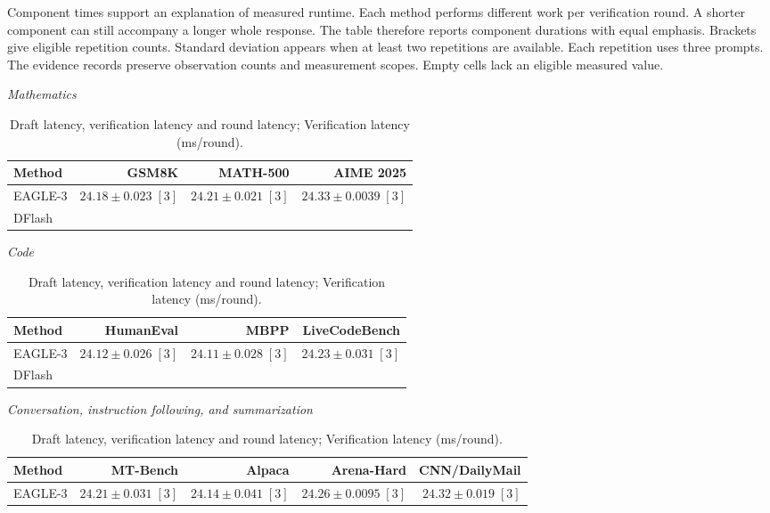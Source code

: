 \documentclass[conference,onecolumn]{IEEEtran}
\begin{document}
\begin{table}[!htp]
\begin{minipage}{\linewidth}
Component times support an explanation of measured runtime. Each method performs different work per verification round. A shorter component can still accompany a longer whole response. The table therefore reports component durations with equal emphasis.
Brackets give eligible repetition counts. Standard deviation appears when at least two repetitions are available. Each repetition uses three prompts. The evidence records preserve observation counts and measurement scopes. Empty cells lack an eligible measured value.
\end{minipage}
\end{table}

\begin{table}[!htp]
\centering\small
\setlength{\tabcolsep}{3pt}
\caption{Draft latency, verification latency and round latency; Verification latency (ms/round).}
\label{tab:appendix-metric-component-time-verification-latency-none}
\textit{Mathematics}\par\smallskip
\begin{tabular}{@{}>{\raggedright\arraybackslash}p{3.7cm}rrr@{}}
\toprule
Method & GSM8K & MATH-500 & AIME 2025 \\
\midrule
EAGLE-3 & \(24.18 \pm 0.023\;[3]\) & \(24.21 \pm 0.021\;[3]\) & \(24.33 \pm 0.0039\;[3]\) \\
DFlash &  &  &  \\
\bottomrule
\end{tabular}\par\medskip
\textit{Code}\par\smallskip
\begin{tabular}{@{}>{\raggedright\arraybackslash}p{3.7cm}rrr@{}}
\toprule
Method & HumanEval & MBPP & LiveCodeBench \\
\midrule
EAGLE-3 & \(24.12 \pm 0.026\;[3]\) & \(24.11 \pm 0.028\;[3]\) & \(24.23 \pm 0.031\;[3]\) \\
DFlash &  &  &  \\
\bottomrule
\end{tabular}\par\medskip
\textit{Conversation, instruction following, and summarization}\par\smallskip
\begin{tabular}{@{}>{\raggedright\arraybackslash}p{3.7cm}rrrr@{}}
\toprule
Method & MT-Bench & Alpaca & Arena-Hard & CNN/DailyMail \\
\midrule
EAGLE-3 & \(24.21 \pm 0.031\;[3]\) & \(24.14 \pm 0.041\;[3]\) & \(24.26 \pm 0.0095\;[3]\) & \(24.32 \pm 0.019\;[3]\) \\

\end{tabular}
\end{table}
\end{document}
